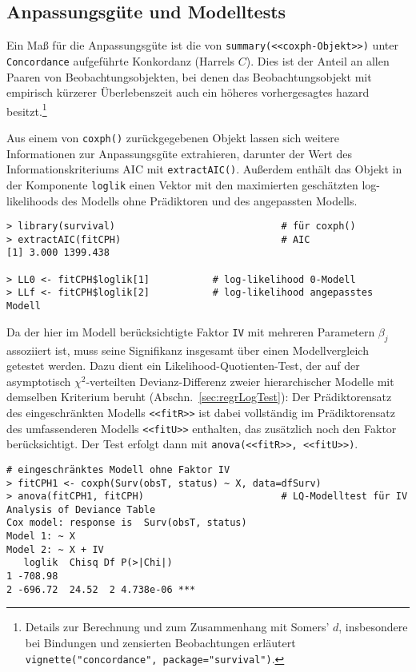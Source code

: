 \subsection{Anpassungsgüte und Modelltests}

Ein Maß für die Anpassungsgüte ist die von \lstinline!summary(<<coxph-Objekt>>)! unter \lstinline!Concordance! aufgeführte Konkordanz (Harrels $C$). Dies ist der Anteil an allen Paaren von Beobachtungsobjekten, bei denen das Beobachtungsobjekt mit empirisch kürzerer Überlebenszeit auch ein höheres vorhergesagtes hazard besitzt.\footnote{Details zur Berechnung und zum Zusammenhang mit Somers' $d$, insbesondere bei Bindungen und zensierten Beobachtungen erläutert \lstinline!vignette("concordance", package="survival")!.}

Aus einem von \lstinline!coxph()! zurückgegebenen Objekt lassen sich weitere Informationen zur Anpassungsgüte extrahieren, darunter der Wert des Informationskriteriums AIC mit \lstinline!extractAIC()!. Außerdem enthält das Objekt in der Komponente \lstinline!loglik! einen Vektor mit den maximierten geschätzten log-likelihoods des Modells ohne Prädiktoren und des angepassten Modells.
\begin{lstlisting}
> library(survival)                             # für coxph()
> extractAIC(fitCPH)                            # AIC
[1] 3.000 1399.438

> LL0 <- fitCPH$loglik[1]           # log-likelihood 0-Modell
> LLf <- fitCPH$loglik[2]           # log-likelihood angepasstes Modell
\end{lstlisting}

Da der hier im Modell berücksichtigte Faktor \lstinline!IV! mit mehreren Parametern $\beta_{j}$ assoziiert ist, muss seine Signifikanz insgesamt über einen Modellvergleich getestet werden. Dazu dient ein Likelihood-Quotienten-Test, der auf der asymptotisch $\chi^{2}$-verteilten Devianz-Differenz zweier hierarchischer Modelle mit demselben Kriterium beruht (Abschn.\ \ref{sec:regrLogTest}): Der Prädiktorensatz des eingeschränkten Modells \lstinline!<<fitR>>! ist dabei vollständig im Prädiktorensatz des umfassenderen Modells \lstinline!<<fitU>>! enthalten, das zusätzlich noch den Faktor berücksichtigt. Der Test erfolgt dann mit \lstinline!anova(<<fitR>>, <<fitU>>)!.
\begin{lstlisting}
# eingeschränktes Modell ohne Faktor IV
> fitCPH1 <- coxph(Surv(obsT, status) ~ X, data=dfSurv)
> anova(fitCPH1, fitCPH)                        # LQ-Modelltest für IV
Analysis of Deviance Table
Cox model: response is  Surv(obsT, status)
Model 1: ~ X
Model 2: ~ X + IV
   loglik  Chisq Df P(>|Chi|)
1 -708.98
2 -696.72  24.52  2 4.738e-06 ***
\end{lstlisting}

